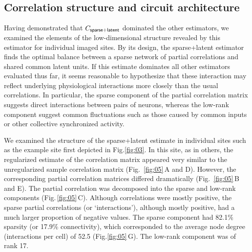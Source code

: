 \documentclass[10pt]{article}
\begin{document}
\subsection*{Correlation structure and circuit architecture}
Having demonstrated that $C_{\sf sparse+latent}$ dominated the other estimators, we examined the elements of the low-dimensional structure revealed by this estimator for individual imaged sites. By its design, the sparse+latent estimator finds the optimal balance between a sparse network of partial correlations and shared common latent units. If this estimate dominates all other estimators evaluated thus far, it seems reasonable to hypothesize that these interaction may reflect underlying physiological interactions more closely than the usual correlations. In particular, the sparse component of the partial correlation matrix suggests direct interactions between pairs of neurons, whereas the low-rank component suggest common fluctuations such as those caused by common inputs or other collective synchronized activity. 

We examined the structure of the sparse+latent estimate in individual sites such as the example site first depicted in Fig.\;\ref{fig:03}. In this site, as in others, the regularized estimate of the correlation matrix appeared very similar to the unregularized sample correlation matrix (Fig.~\ref{fig:05}\,A and D). However, the corresponding partial correlation matrices differed dramatically (Fig.~\ref{fig:05}\,B and E). The partial correlation was decomposed into the sparse and low-rank components (Fig.\,\ref{fig:05}\,C). Although correlations were mostly positive, the sparse partial correlations (or `interactions'), although mostly positive, had a much larger proportion of negative values. The sparse component had 82.1\% sparsity (or 17.9\% connectivity), which corresponded to the average node degree (interactions per cell) of 52.5 (Fig.\;\ref{fig:05}\,G). The low-rank component was of rank 17.
\end{document}
